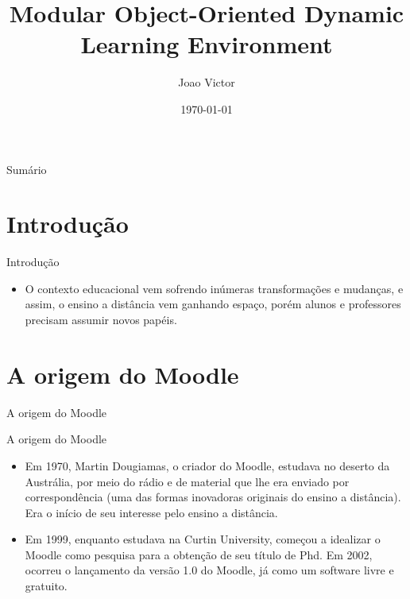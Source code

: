 \documentclass[11pt]{beamer}
\author[Joao Victor]{%
	Joao Victor}
\title[Moodle]{Modular Object-Oriented Dynamic Learning Environment}
\institute[]{%
	\textsuperscript{} Graduando em Licenciatura em Matemática
}
\date{\today}
\begin{document}
\justifying
\onehalfspacing 

\begin{frame}
    \titlepage
\end{frame}

\begin{frame}{Sumário}
	\tableofcontents
\end{frame}

\section{Introdução}

	\begin{frame}{Introdução}
		
		\begin{itemize}
			\justifying
			\item O contexto educacional vem sofrendo inúmeras transformações e mudanças, e assim, o ensino a distância vem ganhando espaço, porém alunos e professores precisam assumir novos papéis.
			
			
		\end{itemize}
	\end{frame}

\section{A origem do Moodle}

	\begin{frame}{A origem do Moodle}
		\begin{block}{A origem do Moodle}
			\begin{itemize}
				\justifying
				\item Em 1970, Martin Dougiamas, o criador do Moodle, estudava no deserto da Austrália, por meio do rádio e de material que lhe era enviado por correspondência (uma das formas inovadoras originais do ensino a distância). Era o início de seu interesse pelo ensino a distância.
				
				\item Em 1999, enquanto estudava na Curtin University, começou a idealizar o Moodle como pesquisa para a obtenção de seu título de Phd. Em 2002, ocorreu o lançamento da versão 1.0 do Moodle, já como um software livre e gratuito. 
			\end{itemize}
		\end{block}
	\end{frame}
	
\end{document}
